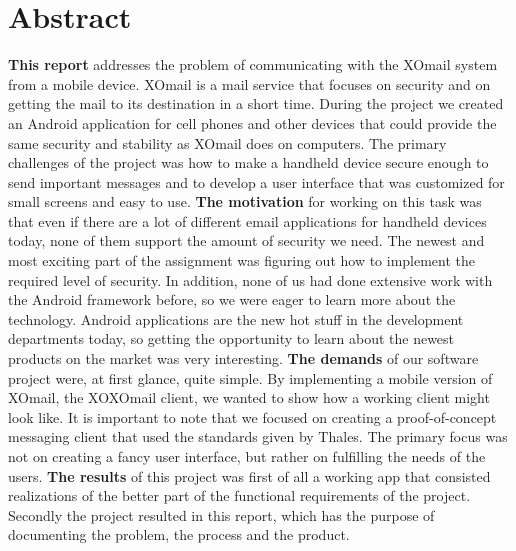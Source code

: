 
\chapter*{Abstract}

\textbf{This report} addresses the problem of communicating with the XOmail system from a mobile device. XOmail is a mail service that focuses on security and on getting the mail to its destination in a short time. During the project we created an Android application for cell phones and other devices that could provide the same security and stability as XOmail does on computers. The primary challenges of the project was how to make a handheld device secure enough to send important messages and to develop a user interface that was customized for small screens and easy to use. 
\newline
\newline
\textbf{The motivation} for working on this task was that even if there are a lot of different email applications for handheld devices today, none of them support the amount of security we need. The newest and most exciting part of the assignment was figuring out how to implement the required level of security. In addition, none of us had done extensive work with the Android framework before, so we were eager to learn more about the technology. Android applications are the new hot stuff in the development departments today, so getting the opportunity to learn about the newest products on the market was very interesting. 
\newline
\newline
\textbf{The demands} of our software project were, at first glance, quite simple. By implementing a mobile version of XOmail, the XOXOmail client, we wanted to show how a working client might look like. It is important to note that we focused on creating a proof-of-concept messaging client that used the standards given by Thales. The primary focus was not on creating a fancy user interface, but rather on fulfilling the needs of the users. 
\newline
\newline
\textbf{The results} of this project was first of all a working app that consisted realizations of the better part of the functional requirements of the project. Secondly the project resulted in this report, which has the purpose of documenting the problem, the process and the product.

